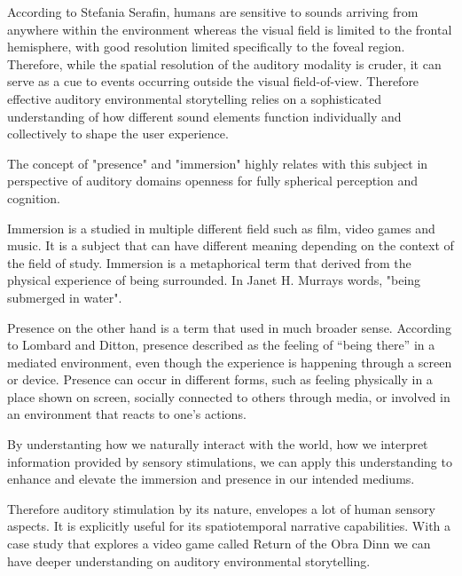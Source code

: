             According to Stefania Serafin, humans are sensitive to sounds arriving from anywhere within the environment whereas the visual field is limited to the frontal hemisphere, with good resolution limited specifically to the foveal region. Therefore, while the spatial resolution of the auditory modality is cruder, it can serve as a cue to events occurring outside the visual field-of-view\cite{Sonic_Interaction_in_Virtual_Environments}. Therefore effective auditory environmental storytelling relies on a sophisticated understanding of how different sound elements function individually and collectively to shape the user experience.\par

            The concept of "presence" and "immersion" highly relates with this subject in perspective of auditory domains openness for fully spherical perception and cognition.\par

            Immersion is a studied in multiple different field such as film, video games and music. It is a subject that can have different meaning depending on the context of the field of study\cite{Sonic_Interaction_in_Virtual_Environments}. Immersion is a metaphorical term that derived from the physical experience of being surrounded. In Janet H. Murrays words, "being submerged in water"\cite{Hamlet_on_the_Holodeck}. 

            Presence on the other hand is a term that used in much broader sense. According to Lombard and Ditton, presence described as the feeling of “being there” in a mediated environment, even though the experience is happening through a screen or device. Presence can occur in different forms, such as feeling physically in a place shown on screen, socially connected to others through media, or involved in an environment that reacts to one’s actions\cite{Concept_of_Presence}.

            By understanting how we naturally interact with the world, how we interpret information provided by sensory stimulations, we can apply this understanding to enhance and elevate the immersion and presence in our intended mediums.\par

            Therefore auditory stimulation by its nature, envelopes a lot of human sensory aspects. It is explicitly useful for its spatiotemporal narrative capabilities. With a case study that explores a video game called Return of the Obra Dinn we can have deeper understanding on auditory environmental storytelling.\par
